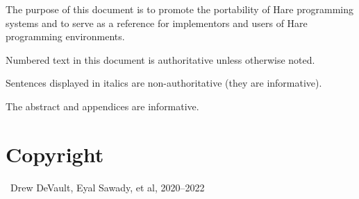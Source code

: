 
\specitem
The purpose of this document is to promote the portability of Hare programming
systems and to serve as a reference for implementors and users of Hare
programming environments.

\specitem
Numbered text in this document is authoritative unless otherwise noted.

\specitem
Sentences displayed in italics are non-authoritative (they are informative).


\specitem
The abstract and appendices are informative.

\section{Copyright}

\textcopyright\ Drew DeVault, Eyal Sawady, et al, 2020--2022

